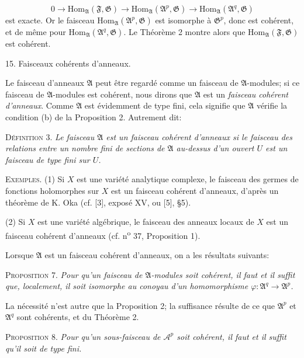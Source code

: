 \begin{equation*}
0 \to \mathrm{Hom}_{\mathfrak{A}}(\mathfrak{F}, \mathfrak{G}) \to \mathrm{Hom}_{\mathfrak{A}}(\mathfrak{A}^p, \mathfrak{G}) \to \mathrm{Hom}_{\mathfrak{A}}(\mathfrak{A}^q, \mathfrak{G})
\end{equation*}
est exacte. Or le faisceau $\mathrm{Hom}_{\mathfrak{A}}(\mathfrak{A}^p, \mathfrak{G})$ est isomorphe à $\mathfrak{G}^p$, donc est cohérent, et de même pour $\mathrm{Hom}_{\mathfrak{A}}(\mathfrak{A}^q, \mathfrak{G})$. Le Théorème 2 montre alors que $\mathrm{Hom}_{\mathfrak{A}}(\mathfrak{F}, \mathfrak{G})$ est cohérent.


15. Faisceaux cohérents d'anneaux.

Le faisceau d'anneaux $\mathfrak{A}$ peut être regardé comme un faisceau de $\mathfrak{A}$-modules; si ce faisceau de $\mathfrak{A}$-modules est cohérent, nous dirons que $\mathfrak{A}$ est un \emph{faisceau cohérent d'anneaux}. Comme $\mathfrak{A}$ est évidemment de type fini, cela signifie que $\mathfrak{A}$ vérifie la condition (b) de la Proposition 2. Autrement dit:

\textsc{Définition} 3. \emph{Le faisceau $\mathfrak{A}$ est un faisceau cohérent d'anneaux si le faisceau des relations entre un nombre fini de sections de $\mathfrak{A}$ au-dessus d'un ouvert $U$ est un faisceau de type fini sur $U$.}

\textsc{Exemples}. (1) Si $X$ est une variété analytique complexe, le faisceau des germes de fonctions holomorphes sur $X$ est un faisceau cohérent d'anneaux, d'après un théorème de K. Oka (cf. [3], exposé XV, ou [5], \S 5).

(2) Si $X$ est une variété algébrique, le faisceau des anneaux locaux de $X$ est un faisceau cohérent d'anneaux (cf. n\textsuperscript{o} 37, Proposition 1).

Lorsque $\mathfrak{A}$ est un faisceau cohérent d'anneaux, on a les résultats suivants:

\textsc{Proposition} 7. \emph{Pour qu'un faisceau de $\mathfrak{A}$-modules soit cohérent, il faut et il suffit que, localement, il soit isomorphe au conoyau d'un homomorphisme $\varphi: \mathfrak{A}^q \to \mathfrak{A}^p$.}

La nécessité n'est autre que la Proposition 2; la suffisance résulte de ce que $\mathfrak{A}^p$ et $\mathfrak{A}^q$ sont cohérents, et du Théorème 2.



\textsc{Proposition} 8. \textit{Pour qu'un sous-faisceau de $\mathcal{A}^p$ soit cohérent, il faut et il suffit qu'il soit de type fini.}

